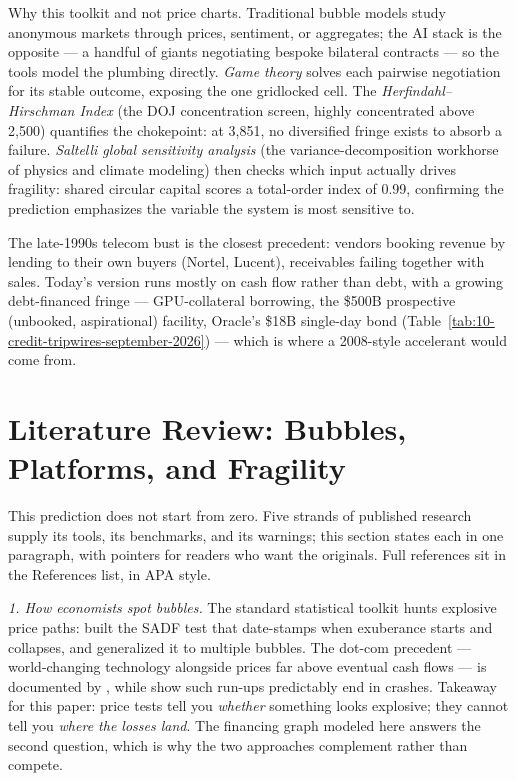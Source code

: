 \documentclass[11pt,a4paper]{article}
\begin{document}
Why this toolkit and not price charts. Traditional bubble models study
anonymous markets through prices, sentiment, or aggregates; the AI stack is
the opposite --- a handful of giants negotiating bespoke bilateral
contracts --- so the tools model the plumbing directly. \emph{Game theory}
solves each pairwise negotiation for its stable outcome, exposing the one
gridlocked cell. The \emph{Herfindahl--Hirschman Index} (the DOJ
concentration screen, highly concentrated above 2,500) quantifies the
chokepoint: at 3,851, no diversified fringe exists to absorb a failure.
\emph{Saltelli global sensitivity analysis} (the variance-decomposition
workhorse of physics and climate modeling) then checks which input actually
drives fragility: shared circular capital scores a total-order index of
0.99, confirming the prediction emphasizes the variable the system is most
sensitive to.

The late-1990s telecom bust is the closest precedent: vendors booking
revenue by lending to their own buyers (Nortel, Lucent), receivables failing
together with sales. Today's version runs mostly on cash
flow rather than debt, with a growing debt-financed fringe --- GPU-collateral
borrowing, the \$500B prospective (unbooked, aspirational) facility, Oracle's \$18B single-day
bond (Table~\ref{tab:10-credit-tripwires-september-2026}) --- which is where a 2008-style accelerant would come from.

\section{Literature Review: Bubbles, Platforms, and Fragility}\label{sec:literature}
This prediction does not start from zero. Five strands of published research
supply its tools, its benchmarks, and its warnings; this section states each
in one paragraph, with pointers for readers who want the originals. Full
references sit in the References list, in APA style.

\emph{1. How economists spot bubbles.} The standard statistical toolkit hunts
explosive price paths: \citet{phillips2011} built the SADF test that
date-stamps when exuberance starts and collapses, and
\citet{phillips2015} generalized it to multiple bubbles. The dot-com
precedent --- world-changing technology alongside prices far above eventual
cash flows --- is documented by \citet{ofek2003}, while \citet{greenwood2019}
show such run-ups predictably end in crashes.
Takeaway for this paper: price tests tell you \emph{whether} something looks
explosive; they cannot tell you \emph{where the losses land}. The financing
graph modeled here answers the second question, which is why the two
approaches complement rather than compete.
\end{document}
